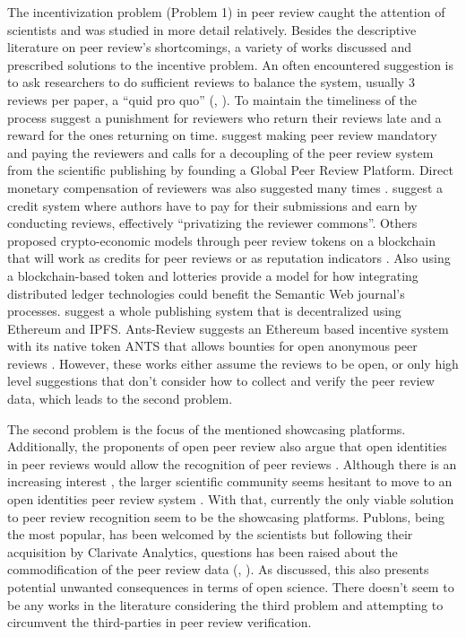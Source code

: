 The incentivization problem (Problem 1) in peer review caught the attention of scientists and was studied in more detail relatively. Besides the descriptive literature on peer review’s shortcomings, a variety of works discussed and prescribed solutions to the incentive problem. An often encountered suggestion is to ask researchers to do sufficient reviews to balance the system, usually 3 reviews per paper, a “quid pro quo” (\cite{Derraik.2015}, \cite[5201]{Grainger.2007}). To maintain the timeliness of the process \cite{Hauser.2007} suggest a punishment for reviewers who return their reviews late and a reward for the ones returning on time. \cite{Ferreira.2016} suggest making peer review mandatory and paying the reviewers and calls for a decoupling of the peer review system from the scientific publishing by founding a Global Peer Review Platform. Direct monetary compensation of reviewers was also suggested many times \parencite{Prufer.2010}. \cite{Fox.2010} suggest a credit system where authors have to pay for their submissions and earn by conducting reviews, effectively “privatizing the reviewer commons”. Others proposed crypto-economic models through peer review tokens on a blockchain that will work as credits for peer reviews or as reputation indicators \parencite{Avital.2018, Jan.2018c, Spearpoint.2017, Tarkhanov.2020}. Also using a blockchain-based token and lotteries \cite{Janowicz.2018} provide a model for how integrating distributed ledger technologies could benefit the Semantic Web journal’s processes. \cite{TenorioFornes.2019} suggest a whole publishing system that is decentralized using Ethereum and \acrshort{IPFS}. Ants-Review suggests an Ethereum based incentive system with its native token ANTS that allows bounties for open anonymous peer reviews \parencite{TrovoMassari}. However, these works either assume the reviews to be open, or only high level suggestions that don't consider how to collect and verify the peer review data, which leads to the second problem.

The second problem is the focus of the mentioned showcasing platforms. Additionally, the proponents of open peer review also argue that open identities in peer reviews would allow the recognition of peer reviews \parencite[3]{RossHellauer.2017b}. Although there is an increasing interest \parencite{Wolfram.2020}, the larger scientific community seems hesitant to move to an open identities peer review system \parencite{RossHellauer.2017b, Ware.2008, Taylor&Francis.2015}. With that, currently the only viable solution to peer review recognition seem to be the showcasing platforms. Publons, being the most popular, has been welcomed by the scientists but following their acquisition by Clarivate Analytics, questions has been raised about the commodification of the peer review data (\cite[14]{Tennant.2017}, \cite{TeixeiradaSilva.2019}). As discussed, this also presents potential unwanted consequences in terms of open science. There doesn't seem to be any works in the literature considering the third problem and attempting to circumvent the third-parties in peer review verification. 

